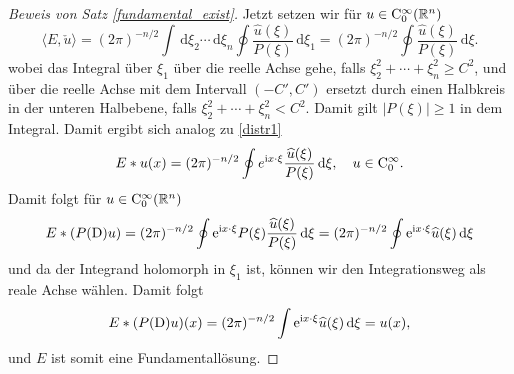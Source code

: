 \begin{proof}[Beweis von Satz \ref{fundamental_exist}]
Jetzt setzen wir für $u\in\mathrm C_0^\infty(\mathbb R^n)$
\begin{equation}\label{distr3}
\langle E, \check u\rangle  = (2\pi)^{-n/2} \int \, \mathrm d\xi_2 \cdots \, \mathrm d\xi_n \oint \frac{\widehat u(\xi)}{P(\xi)} \, \mathrm d\xi_1= (2\pi)^{-n/2} \oint \frac{\widehat u(\xi)}{P(\xi)} \, \mathrm d\xi.
\end{equation}
wobei das Integral über $\xi_1$ über die reelle Achse gehe, falls $\xi_2^2+ \cdots + \xi_n^2 \ge C^2$, und über die reelle Achse mit dem Intervall $(-C', C')$ ersetzt durch einen Halbkreis in der unteren Halbebene, falls $\xi_2^2+ \cdots+ \xi_n^2 < C^2$. Damit gilt $|P(\xi)|\ge 1$  in dem Integral.  Damit ergibt sich analog zu \eqref{distr1}
\begin{equation}
E*u(x) = (2\pi)^{-n/2}\oint e^{\mathrm i x\cdot \xi } \frac{\widehat u(\xi)}{P(\xi)}\, \mathrm d\xi, \quad u \in \mathrm C_0^\infty.
\end{equation} 
Damit folgt für $u\in\mathrm C_0^\infty(\mathbb R^n)$
\begin{equation}
E*(P(\mathrm D)u) = (2\pi)^{-n/2} \oint \mathrm e^{\mathrm i x\cdot\xi} P(\xi)  \frac{\widehat{u} (\xi)}{P(\xi)}\, \mathrm d\xi=(2\pi)^{-n/2} \oint \mathrm e^{\mathrm i x\cdot \xi} \widehat u(\xi) \, \mathrm d\xi
\end{equation}
und da der Integrand holomorph in $\xi_1$ ist, können wir den Integrationsweg als reale Achse wählen. Damit folgt
\begin{equation}
E*(P(\mathrm D) u)(x) = (2\pi)^{-n/2} \int \mathrm e^{\mathrm i x\cdot \xi} \widehat u(\xi) \, \mathrm d\xi = u(x),
\end{equation}
und $E$ ist somit eine Fundamentallösung.


\end{proof}
